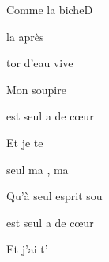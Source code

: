 \begin{song}{Comme la biche}{D}
  {}
  {}
  {}
  {}


	\begin{SBOpGroup}

 la  apr\`es

 tor d'eau vive

Mon  soupire   


 est  seul a de  c\oe{}ur

Et je  te 

	\end{SBOpGroup}

	\begin{SBOpGroup}
 seul  ma , ma 

Qu'\`a  seul  esprit  sou
	\end{SBOpGroup}


	\begin{SBOpGroup}
 est  seul a de  c\oe{}ur

Et j'ai   t'

	\end{SBOpGroup}

\end{song}
